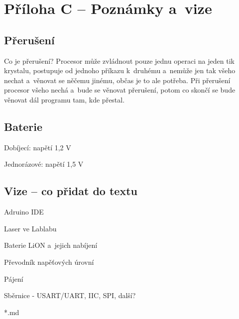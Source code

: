 \section*{Příloha C -- Poznámky a~vize}



\subsection*{Přerušení}

Co je přerušení? Procesor může zvládnout pouze jednu operaci na jeden tik krystalu, 
postupuje od jednoho příkazu k~druhému a~nemůže jen tak všeho nechat a~věnovat se něčemu jinému, občas je to ale potřeba.
 Při přerušení procesor všeho nechá a~bude se věnovat přerušení, potom co skončí se bude věnovat dál programu tam, kde přestal. 

\subsection*{Baterie}

Dobíjecí: napětí 1,2 V~

Jednorázové: napětí 1,5 V~
 

\subsection*{Vize -- co přidat do textu}

Adruino IDE 

Laser ve Lablabu 

Baterie LiON a~jejich nabíjení 

Převodník napěťových úrovní 

Pájení 

Sběrnice - USART/UART, IIC, SPI, další?




*.md 


